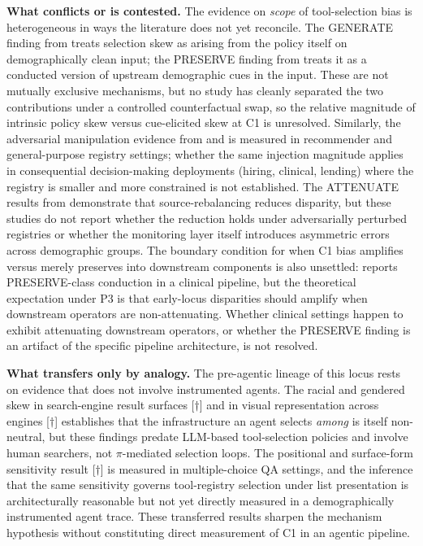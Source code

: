 \documentclass[10pt]{article}
\begin{document}
\textbf{What conflicts or is contested.} The evidence on \emph{scope} of tool-selection bias is heterogeneous in ways the literature does not yet reconcile. The GENERATE finding from \cite{blankenstein2025biasbusters} treats selection skew as arising from the policy itself on demographically clean input; the PRESERVE finding from \cite{xu2026ducx} treats it as a conducted version of upstream demographic cues in the input. These are not mutually exclusive mechanisms, but no study has cleanly separated the two contributions under a controlled counterfactual swap, so the relative magnitude of intrinsic policy skew versus cue-elicited skew at C1 is unresolved. Similarly, the adversarial manipulation evidence from \cite{sneh2025tooltweak} and \cite{tang2026your} is measured in recommender and general-purpose registry settings; whether the same injection magnitude applies in consequential decision-making deployments (hiring, clinical, lending) where the registry is smaller and more constrained is not established. The ATTENUATE results from \cite{singh2025bias,singh2025biasb} demonstrate that source-rebalancing reduces disparity, but these studies do not report whether the reduction holds under adversarially perturbed registries or whether the monitoring layer itself introduces asymmetric errors across demographic groups. The boundary condition for when C1 bias amplifies versus merely preserves into downstream components is also unsettled: \cite{xu2026ducx} reports PRESERVE-class conduction in a clinical pipeline, but the theoretical expectation under P3 is that early-locus disparities should amplify when downstream operators are non-attenuating. Whether clinical settings happen to exhibit attenuating downstream operators, or whether the PRESERVE finding is an artifact of the specific pipeline architecture, is not resolved.

\textbf{What transfers only by analogy.} The pre-agentic lineage of this locus rests on evidence that does not involve instrumented agents. The racial and gendered skew in search-engine result surfaces \cite{u2018algorithms}[$\dagger$] and in visual representation across engines \cite{makhortykh2021detecting}[$\dagger$] establishes that the infrastructure an agent selects \emph{among} is itself non-neutral, but these findings predate LLM-based tool-selection policies and involve human searchers, not $\pi$-mediated selection loops. The positional and surface-form sensitivity result \cite{pezeshkpour2023large}[$\dagger$] is measured in multiple-choice QA settings, and the inference that the same sensitivity governs tool-registry selection under list presentation is architecturally reasonable but not yet directly measured in a demographically instrumented agent trace. These transferred results sharpen the mechanism hypothesis without constituting direct measurement of C1 in an agentic pipeline.
\end{document}
